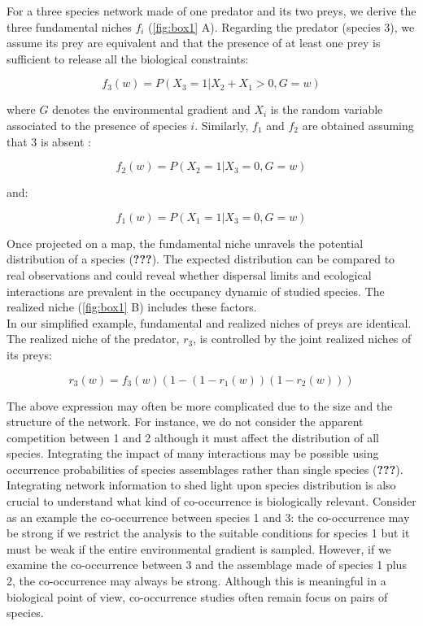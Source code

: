 For a three species network made of one predator and its two preys, we
derive the three fundamental niches \(f_i\) (\ref{fig:box1} A).
Regarding the predator (species 3), we assume its prey are equivalent
and that the presence of at least one prey is sufficient to release all
the biological constraints:

\[f_3(w)=P(X_3=1|X_2+X_1>0, G=w)\]

where \(G\) denotes the environmental gradient and \(X_i\) is the random
variable associated to the presence of species \(i\). Similarly, \(f_1\)
and \(f_2\) are obtained assuming that 3 is absent :

\[f_2(w)=P(X_2=1|X_3=0, G=w)\]

and:

\[f_1(w)=P(X_1=1|X_3=0, G=w)\]

Once projected on a map, the fundamental niche unravels the potential
distribution of a species ({\textbf{???}}). The expected distribution
can be compared to real observations and could reveal whether dispersal
limits and ecological interactions are prevalent in the occupancy
dynamic of studied species. The realized niche (\ref{fig:box1} B)
includes these factors.\\
In our simplified example, fundamental and realized niches of preys are
identical. The realized niche of the predator, \(r_3\), is controlled by
the joint realized niches of its preys:

\[r_3(w)=f_3(w)\left(1-(1-r_1(w))(1-r_2(w))\right)\]

The above expression may often be more complicated due to the size and
the structure of the network. For instance, we do not consider the
apparent competition between 1 and 2 although it must affect the
distribution of all species. Integrating the impact of many interactions
may be possible using occurrence probabilities of species assemblages
rather than single species ({\textbf{???}}). Integrating network
information to shed light upon species distribution is also crucial to
understand what kind of co-occurrence is biologically relevant. Consider
as an example the co-occurrence between species 1 and 3: the
co-occurrence may be strong if we restrict the analysis to the suitable
conditions for species 1 but it must be weak if the entire environmental
gradient is sampled. However, if we examine the co-occurrence between 3
and the assemblage made of species 1 plus 2, the co-occurrence may
always be strong. Although this is meaningful in a biological point of
view, co-occurrence studies often remain focus on pairs of species.

